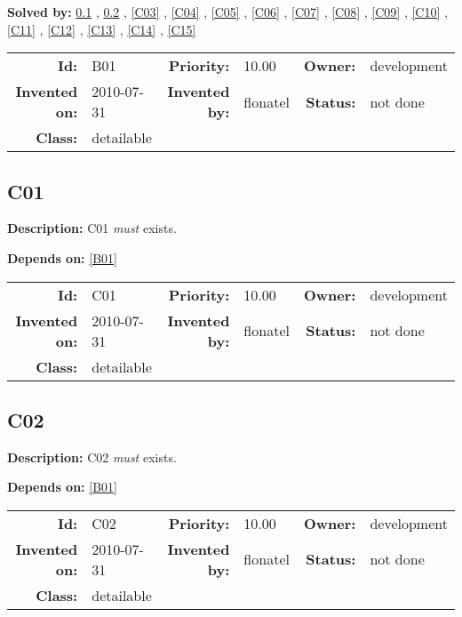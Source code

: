 \textbf{Solved by:} \ref{C01} , \ref{C02} , \ref{C03} , \ref{C04} , \ref{C05} , \ref{C06} , \ref{C07} , \ref{C08} , \ref{C09} , \ref{C10} , \ref{C11} , \ref{C12} , \ref{C13} , \ref{C14} , \ref{C15} 

\par
{\small \begin{center}\begin{tabular}{rlrlrl}
\textbf{Id:} & B01  & \textbf{Priority:} & 10.00  & \textbf{Owner:} & development\\ 
\textbf{Invented on:} & 2010-07-31  & \textbf{Invented by:} & flonatel  & \textbf{Status:} & not done \\ 
\textbf{Class:} & detailable  & & & \end{tabular}\end{center} }

\subsection{C01}\label{C01}
\textbf{Description:} C01 \textsl{must} exists.

\textbf{Depends on:} \ref{B01} 

\par
{\small \begin{center}\begin{tabular}{rlrlrl}
\textbf{Id:} & C01  & \textbf{Priority:} & 10.00  & \textbf{Owner:} & development\\ 
\textbf{Invented on:} & 2010-07-31  & \textbf{Invented by:} & flonatel  & \textbf{Status:} & not done \\ 
\textbf{Class:} & detailable  & & & \end{tabular}\end{center} }

\subsection{C02}\label{C02}
\textbf{Description:} C02 \textsl{must} exists.

\textbf{Depends on:} \ref{B01} 

\par
{\small \begin{center}\begin{tabular}{rlrlrl}
\textbf{Id:} & C02  & \textbf{Priority:} & 10.00  & \textbf{Owner:} & development\\ 
\textbf{Invented on:} & 2010-07-31  & \textbf{Invented by:} & flonatel  & \textbf{Status:} & not done \\ 
\textbf{Class:} & detailable  & & & \end{tabular}\end{center} }

